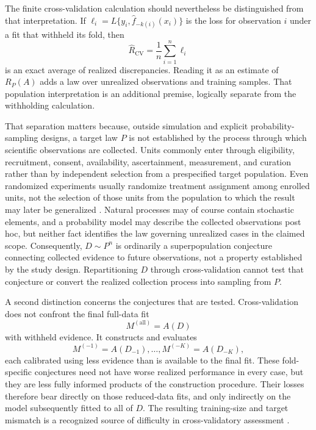 \documentclass[11pt]{article}
\theoremstyle{remark}
\begin{document}
The finite cross-validation calculation should nevertheless be distinguished
from that interpretation. If
$\ell_i=L\{y_i,\hat f_{-k(i)}(x_i)\}$ is the loss for observation $i$ under a
fit that withheld its fold, then
\[
\widehat R_{\mathrm{CV}}
=
\frac{1}{n}\sum_{i=1}^n\ell_i
\]
is an exact average of realized discrepancies. Reading it as an estimate of
$R_P(A)$ adds a law over unrealized observations and training samples. That
population interpretation is an additional premise, logically separate from
the withholding calculation.

That separation matters because, outside simulation and explicit
probability-sampling designs, a target law $P$ is not established by the
process through which scientific observations are collected. Units commonly
enter through eligibility, recruitment, consent, availability, ascertainment,
measurement, and curation rather than by independent selection from a
prespecified target population. Even randomized experiments usually randomize
treatment assignment among enrolled units, not the selection of those units
from the population to which the result may later be generalized
\cite{stuart2018generalizability,westreich2017transportability}. Natural
processes may of course contain stochastic elements, and a probability model
may describe the collected observations post hoc, but neither fact identifies
the law governing unrealized cases in the claimed scope. Consequently,
$D\sim P^n$ is ordinarily a superpopulation conjecture connecting collected
evidence to future observations, not a property established by the study
design. Repartitioning $D$ through cross-validation cannot test that conjecture
or convert the realized collection process into sampling from $P$.

A second distinction concerns the conjectures that are tested. Cross-validation
does not confront the final full-data fit
\[
M^{(\mathrm{all})}=A(D)
\]
with withheld evidence. It constructs and evaluates
\[
M^{(-1)}=A(D_{-1}),\ldots,M^{(-K)}=A(D_{-K}),
\]
each calibrated using less evidence than is available to the final fit. These
fold-specific conjectures need not have worse realized performance in every
case, but they are less fully informed products of the construction procedure.
Their losses therefore bear directly on those reduced-data fits, and only
indirectly on the model subsequently fitted to all of $D$. The resulting
training-size and target mismatch is a recognized source of difficulty in
cross-validatory assessment
\cite{burman1989comparative,bates2024crossvalidation}.
\end{document}
